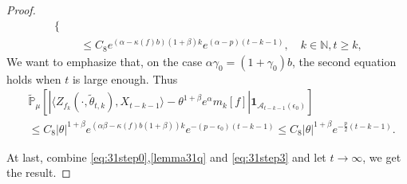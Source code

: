\documentclass[12pt, a4paper]{amsart}
\theoremstyle{definition}
\numberwithin{equation}{section}
\begin{document}
\begin{proof}
\begin{align}
\begin{cases}
    \end{cases}
    \\& \leq C_8 e^{(\alpha-\kappa(f)b)(1+\beta)k}e^{(\alpha-p)(t-k-1)}, \quad k\in \mathbb{N}, t\geq k,
\end{align}
We want to emphasize that, on the case $\alpha\gamma_0=(1+\gamma_0)b$, the second equation holds when $t$ is large enough. Thus
\begin{align}
    &\mathbb{\tilde{P}}_{\mu}\left[\left|\langle Z_{f_k}(\cdot,\tilde{\theta}_{t,k}),X_{t-k-1}\rangle-\theta^{1+\beta}e^{\alpha}m_k[f]\right|\mathbf{1}_{\mathcal{A}_{t-k-1}(\epsilon_0)}\right]
    \\ & \leq C_8 |\theta|^{1+\beta}e^{(\alpha\beta-\kappa(f)b(1+\beta))k}e^{-(p-\epsilon_0)(t-k-1)} \leq C_8 |\theta|^{1+\beta}e^{-\frac{p}{2}(t-k-1)}.
\end{align}

At last, combine \eqref{eq:31step0},\eqref{lemma31q} and \eqref{eq:31step3} and let $t\rightarrow\infty$, we get the result.
\end{proof}
\end{document}
